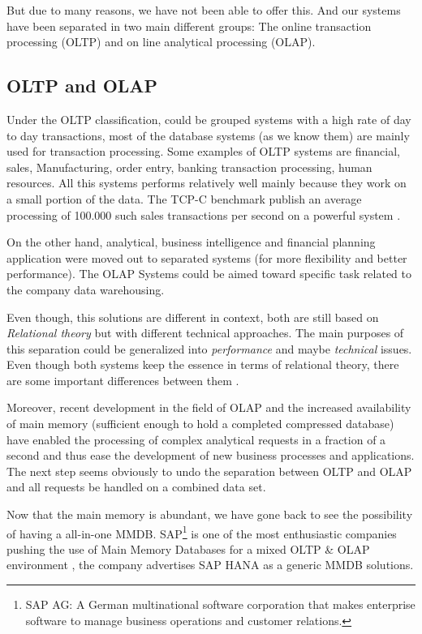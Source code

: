 \documentclass[12pt]{article} %
\begin{document}
    But due to many reasons, we have not been able to offer this. And our systems have been separated in two main different groups: The online transaction processing (OLTP) and on line analytical processing (OLAP).

\subsection{OLTP and OLAP}
    Under the OLTP classification, could be grouped systems with a high rate of day to day transactions, most of the database systems (as we know them) are mainly used for transaction processing. Some examples of OLTP systems are financial, sales, Manufacturing, order entry, banking transaction processing, human resources. All this systems performs relatively well mainly because they work on a small portion of the data. The TCP-C benchmark publish an average processing of 100.000 such sales transactions per second on a powerful system \cite{Kemper}.
    
    On the other hand, analytical, business intelligence and financial planning application were moved out to separated systems (for more flexibility and better performance). The OLAP Systems could be aimed toward specific task related to the company data warehousing. 
    
    Even though, this solutions are different in context, both are still based on \emph{ Relational theory } but with different technical approaches. The main purposes of this separation could be generalized into \emph{ performance } and maybe \emph{technical} issues. Even though both systems keep the essence in terms of relational theory, there are some important differences between them \cite{Plattner}.

    Moreover, recent development in the field of OLAP and the increased availability of main memory (sufficient enough to hold a completed compressed database) have enabled the processing of complex analytical requests in a fraction of a second and thus ease the development of new business processes and applications. The next step seems obviously to undo the separation between OLTP and OLAP and all requests be handled on a combined data set.


    Now that the main memory is abundant, we have gone back to see the possibility of having a all-in-one MMDB. SAP\footnote{SAP AG: A German multinational software corporation that makes enterprise software to manage business operations and customer relations.} is one of the most enthusiastic companies pushing the use of Main Memory Databases for a mixed OLTP \& OLAP environment \cite{Plattner}, the company advertises SAP HANA as a generic MMDB solutions. 
    
\end{document}
